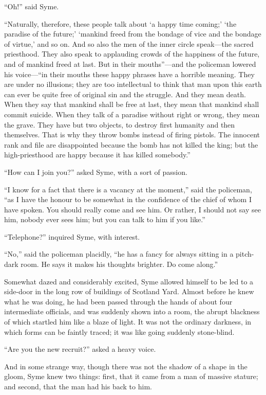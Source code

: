 \documentclass{book}
\begin{document}
“Oh!” said Syme.

“Naturally, therefore, these people talk about ‘a happy time coming;’ ‘the paradise of the future;’ ‘mankind freed from the bondage of vice and the bondage of virtue,’ and so on. And so also the men of the inner circle speak—the sacred priesthood. They also speak to applauding crowds of the happiness of the future, and of mankind freed at last. But in their mouths”—and the policeman lowered his voice—“in their mouths these happy phrases have a horrible meaning. They are under no illusions; they are too intellectual to think that man upon this earth can ever be quite free of original sin and the struggle. And they mean death. When they say that mankind shall be free at last, they mean that mankind shall commit suicide. When they talk of a paradise without right or wrong, they mean the grave. They have but two objects, to destroy first humanity and then themselves. That is why they throw bombs instead of firing pistols. The innocent rank and file are disappointed because the bomb has not killed the king; but the high-priesthood are happy because it has killed somebody.”

“How can I join you?” asked Syme, with a sort of passion.

“I know for a fact that there is a vacancy at the moment,” said the policeman, “as I have the honour to be somewhat in the confidence of the chief of whom I have spoken. You should really come and see him. Or rather, I should not say see him, nobody ever sees him; but you can talk to him if you like.”

“Telephone?” inquired Syme, with interest.

“No,” said the policeman placidly, “he has a fancy for always sitting in a pitch-dark room. He says it makes his thoughts brighter. Do come along.”

Somewhat dazed and considerably excited, Syme allowed himself to be led to a side-door in the long row of buildings of Scotland Yard. Almost before he knew what he was doing, he had been passed through the hands of about four intermediate officials, and was suddenly shown into a room, the abrupt blackness of which startled him like a blaze of light. It was not the ordinary darkness, in which forms can be faintly traced; it was like going suddenly stone-blind.

“Are you the new recruit?” asked a heavy voice.

And in some strange way, though there was not the shadow of a shape in the gloom, Syme knew two things: first, that it came from a man of massive stature; and second, that the man had his back to him.
\end{document}
